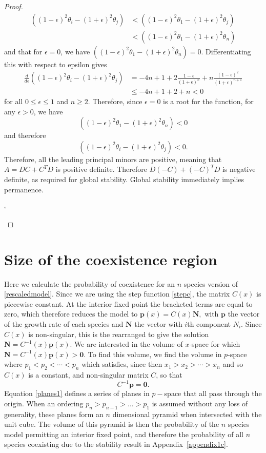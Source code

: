 \begin{proof}
\begin{align*}
\left( (1-\epsilon)^2\theta_i-(1+\epsilon)^2\theta_j\right)&<\left( (1-\epsilon)^2\theta_1-(1+\epsilon)^2\theta_j\right)\\
&<\left( (1-\epsilon)^2\theta_1-(1+\epsilon)^2\theta_n\right)
\end{align*}
and that for $\epsilon=0$, we have $\left( (1-\epsilon)^2\theta_1-(1+\epsilon)^2\theta_n\right)=0$. Differentiating this with respect to epsilon gives
\begin{align*}
\frac{d}{d\epsilon}\left( (1-\epsilon)^2\theta_i-(1+\epsilon)^2\theta_j\right)&=-4n+1+2\frac{1-\epsilon}{(1+\epsilon)^n}+n\frac{(1-\epsilon)^2}{(1+\epsilon)^{n+1}}\\
&\leq-4n +1+2+n < 0
\end{align*}
for all $0\leq \epsilon \leq 1$ and $n\geq2$. Therefore, since $\epsilon=0$ is a root for the function, for any $\epsilon>0$, we have
$$\left( (1-\epsilon)^2\theta_1-(1+\epsilon)^2\theta_n\right)<0$$
and therefore
$$\left( (1-\epsilon)^2\theta_i-(1+\epsilon)^2\theta_j\right)<0.$$
Therefore, all the leading principal minors are positive, meaning that $A=DC+C^TD$ is positive definite. Therefore $D(-C)+(-C)^TD$ is negative definite, as required for global stability. Global stability immediately implies permanence. \begin{flushright} $\square$ \end{flushright}
 \end{proof}
 
 \section{Size of the coexistence region}
 \label{appendix1d}
Here we calculate the probability of coexistence for an $n$ species version of \eqref{rescaledmodel}. Since we are using the step function \eqref{stepc}, the matrix $C(x)$ is piecewise constant. At the interior fixed point the bracketed terms are equal to zero, which therefore reduces the model to
$
\mathbf{p}(x)=C(x)\mathbf{N},
$
with $\mathbf{p}$ the vector of the growth rate of each species and $\mathbf{N}$ the vector with $i$th component $N_i$. Since $C(x)$ is non-singular, this is the rearranged to give the solution 
$
\mathbf{N}=C^{-1}(x)\mathbf{p}(x)$. 
We are interested in the volume of $x$-space for which $\mathbf{N}=C^{-1}(x)\mathbf{p}(x)> \mathbf{0}$. To find this volume, we find the volume in $p$-space where $p_1 < p_2 <\cdots < p_n$ which satisfies, since then $x_1>x_2> \cdots > x_n$ and so $C(x)$ is a constant, and non-singular matrix $C$, so that
\begin{equation}
C^{-1}\mathbf{p} = \mathbf{0}. \label{planes1}
\end{equation}
Equation \eqref{planes1} defines a series of planes in $p-$space that all pass through the origin. When an ordering $p_n>p_{n-1}>\dots>p_1$ is assumed without any loss of generality, these planes form an $n$ dimensional pyramid when intersected with the unit cube. The volume of this pyramid is then the probability of the $n$ species model permitting an interior fixed point, and therefore the probability of all $n$ species coexisting due to the stability result in Appendix~\ref{appendix1c}.

